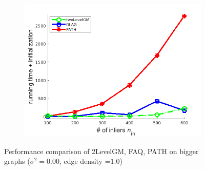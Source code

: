 \begin{figure}[h]
\begin{subfigure}[b]{0.3\textwidth}
			\centering
			\includegraphics[scale=0.25]{"chapter3/fig/SyntheticTest_BigGraphs/descr/Results_v4.3.3/Test1/time_summary_avg1t"} 
		\end{subfigure} 	
	\caption[Performance comparison of 2LevelGM, FAQ, PATH on bigger graphs]{Performance comparison of 2LevelGM, FAQ, PATH on bigger graphs ($\sigma^2=0.00$, edge density =$1.0$)}
	\label{fig:synTest1_bigGraphs_ver433}
\end{figure}
\FloatBarrier




